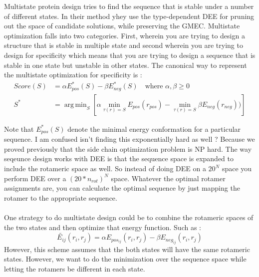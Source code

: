 \documentclass{article}
\DeclareMathOperator*{\argmin}{arg\,min}
\begin{document}
Multistate protein design tries to find the sequence that is stable under a number of different states. In their method yhey use the type-dependent DEE for pruning out the space of candidate solutions, while preserving the GMEC. Multistate optimization falls into two categories. First, wherein you are trying to design a structure that is stable in multiple state and second wherein you are trying to design for specificity which means that you are trying to design a sequence that is stable in one state but unstable in other states. The canonical way to represent the multistate optimization for specificity is :
\[
\begin{split}
Score(S) &= \alpha E_{pos}^*(S) - \beta E_{neg}^*(S) \quad \text{where } \alpha,\beta \geq 0 \\
S^* & = \argmin_S \left[\alpha \min_{\tau(r)=S} E_{pos}(r_{pos}) - \min_{\tau(r)=S} \beta E_{neg}(r_{neg})) \right]
\end{split} 
\]

Note that $E_{pos}^*(S)$ denote the minimal energy conformation for a particular sequence. I am confused isn't finding this exponentially hard as well ? Because we proved previously that the side chain optimization problem is NP hard. The way seqeunce design works with DEE is that the sequence space is expanded to include the rotameric space as well. So instead of doing DEE on a $20^N$ space you perform DEE over a $(20*n_{rot})^N$ space. Whatever the optimal rotamer assignments are, you can calculate the optimal sequence by just mapping the rotamer to the appropriate sequence. 
\\
\\
One strategy to do multistate design could be to combine the rotameric spaces of the two states and then optimize that energy function. Such as  : 
\[
\tilde{E_{ij}}(r_i,r_j) = \alpha E_{pos_{ij}}(r_i,r_j) - \beta E_{neg_{ij}}(r_i,r_j)
\]
However, this scheme assumes that the both states will have the same rotameric states. However, we want to do the minimization over the sequence space while letting the rotamers be different in each state. 





\end{document}
